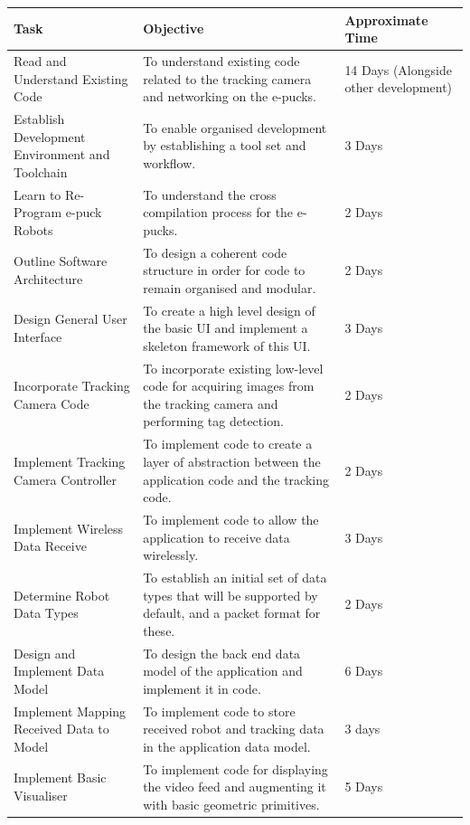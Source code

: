 \documentclass[titlepage,hidelinks,10pt]{article}
\begin{document}
\begin{table}[H]
\begin{tabular}[h]{ |>{\raggedright}p{5cm}|>{\raggedright}p{7cm}|p{3cm}| }
  \hline
  Task & Objective & Approximate Time \\\hline
  Read and Understand Existing Code 				& To understand existing code related to the tracking camera and networking on the e-pucks. 							& 14 Days (Alongside other development)\\ \hline
  Establish Development Environment and Toolchain 	& To enable organised development by establishing a tool set and workflow. 												& 3 Days \\ \hline
  Learn to Re-Program e-puck Robots 				& To understand the cross compilation process for the e-pucks. 															& 2 Days \\ \hline
  Outline Software Architecture 					& To design a coherent code structure in order for code to remain organised and modular. 								& 2 Days \\ \hline
  Design General User Interface 					& To create a high level design of the basic UI and implement a skeleton framework of this UI.							& 3 Days \\ \hline
  Incorporate Tracking Camera Code 					& To incorporate existing low-level code for acquiring images from the tracking camera and performing tag detection. 	& 2 Days \\ \hline
  Implement Tracking Camera Controller 				& To implement code to create a layer of abstraction between the application code and the tracking code. 				& 2 Days \\ \hline
  Implement Wireless Data Receive 					& To implement code to allow the application to receive data wirelessly. 												& 3 Days \\ \hline
  Determine Robot Data Types 						& To establish an initial set of data types that will be supported by default, and a packet format for these. 			& 2 Days \\ \hline
  Design and Implement Data Model 					& To design the back end data model of the application and implement it in code.										& 6 Days \\ \hline
  Implement Mapping Received Data to Model 			& To implement code to store received robot and tracking data in the application data model. 							& 3 days \\ \hline
  Implement Basic Visualiser 						& To implement code for displaying the video feed and augmenting it with basic geometric primitives. 					& 5 Days \\ \hline

\end{tabular}
\end{table}
\end{document}
